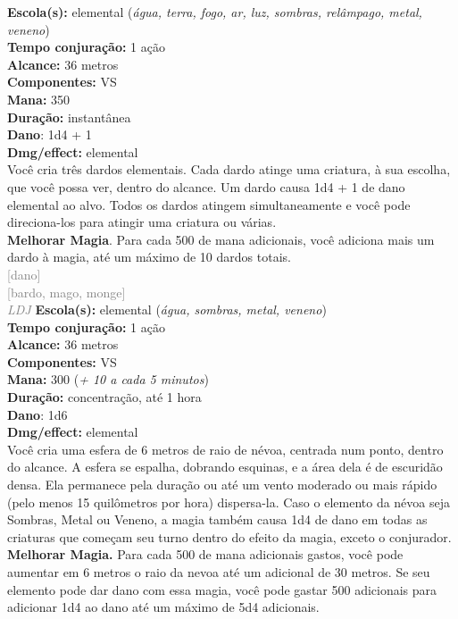 \documentclass{RPG_Adventure}[2021/10/20]
\begin{document}
{\small \t \textbf{Escola(s):} elemental (\textit{água, terra, fogo, ar, luz, sombras, relâmpago, metal, veneno})\\\t \textbf{Tempo conjuração:} 1 ação\\\t \textbf{Alcance:} 36 metros\\\t \textbf{Componentes:} VS\\\t \textbf{Mana:} 350\\\t \textbf{Duração:} instantânea\\\t \textbf{Dano}: 1d4 + 1\\\t \textbf{Dmg/effect:} elemental\\}
{\normalsize Você cria três dardos elementais. Cada dardo atinge uma criatura, à sua escolha, que você possa ver, dentro do alcance. Um dardo causa 1d4 + 1 de dano elemental ao alvo. Todos os dardos atingem simultaneamente e você pode direciona-los para atingir uma criatura ou várias.\\\t \textbf{Melhorar Magia}. Para cada 500 de mana adicionais, você adiciona mais um dardo à magia, até um máximo de 10 dardos totais.\\}
{\scriptsize \textcolor{gray}{[dano]\\}}
{\scriptsize \textcolor{gray}{[bardo, mago, monge]\\}}
{\tiny \textcolor{gray}{\textit{LDJ}}}
{\small \t \textbf{Escola(s):} elemental (\textit{água, sombras, metal, veneno})\\\t \textbf{Tempo conjuração:} 1 ação\\\t \textbf{Alcance:} 36 metros\\\t \textbf{Componentes:} VS\\\t \textbf{Mana:} 300 (\textit{+ 10 a cada 5 minutos})\\\t \textbf{Duração:} concentração, até 1 hora\\\t \textbf{Dano}: 1d6\\\t \textbf{Dmg/effect:} elemental\\}
{\normalsize Você cria uma esfera de 6 metros de raio de névoa, centrada num ponto, dentro do alcance. A esfera se espalha, dobrando esquinas, e a área dela é de escuridão densa. Ela permanece pela duração ou até um vento moderado ou mais rápido (pelo menos 15 quilômetros por hora) dispersa-la. Caso o elemento da névoa seja Sombras, Metal ou Veneno, a magia também causa 1d4 de dano em todas as criaturas que começam seu turno dentro do efeito da magia, exceto o conjurador.\\\t \textbf{Melhorar Magia.} Para cada 500 de mana adicionais gastos, você pode aumentar em 6 metros o raio da nevoa até um adicional de 30 metros. Se seu elemento pode dar dano com essa magia, você pode gastar 500 adicionais para adicionar 1d4 ao dano até um máximo de 5d4 adicionais.\\}
\end{document}

